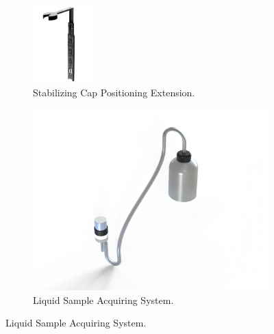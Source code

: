 \begin{figure}[hb!] 
    \centering
    \begin{subfigure}[b]{0.49\columnwidth} 
        \centering
        \includegraphics[height=3cm]{Sections/2Design Rationale/images/Stabilizing Cap Positioning Extension (SCPE) .jpg}
        \caption{\scriptsize Stabilizing Cap Positioning Extension.}
        \label{fig:scpe}
    \end{subfigure}
    \hfill
    \begin{subfigure}[b]{0.49\columnwidth}
        \centering
        \includegraphics[width=\linewidth]{Sections/2Design Rationale/images/Pump.png}
        \caption{\scriptsize Liquid Sample Acquiring System.}
        \label{fig:pump}
    \end{subfigure}

    \vspace{0.2cm}


\end{figure}
